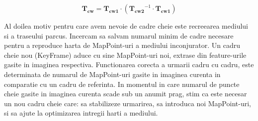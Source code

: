 \documentclass[12pt,a4paper]{report}
\begin{document}
\begin{equation}
\mathbf{T_{cw}} = \mathbf{T_{cw1}} \cdot \left( \mathbf{T_{cw2}}^{-1} \cdot \mathbf{T_{cw1}} \right)
\end{equation} 

Al doilea motiv pentru care avem nevoie de cadre cheie este recreearea mediului si a traseului parcus.
Incercam sa salvam numarul minim de cadre necesare pentru a reproduce harta de MapPoint-uri a mediului
inconjurator. Un cadru cheie nou (KeyFrame) aduce cu sine MapPoint-uri noi, extrase din feature-urile
gasite in imaginea respectiva. Functionarea corecta a urmarii cadru cu cadru, este determinata de numarul de 
MapPoint-uri gasite in imaginea curenta in comparatie cu un cadru de referinta. In momentul 
in care numarul de puncte cheie gasite in imaginea curenta scade sub un anumit prag, stim ca este
necesar un nou cadru cheie care: sa stabilizeze urmarirea, sa introduca noi MapPoint-uri, si sa 
ajute la optimizarea intregii harti a mediului. 
\end{document}
